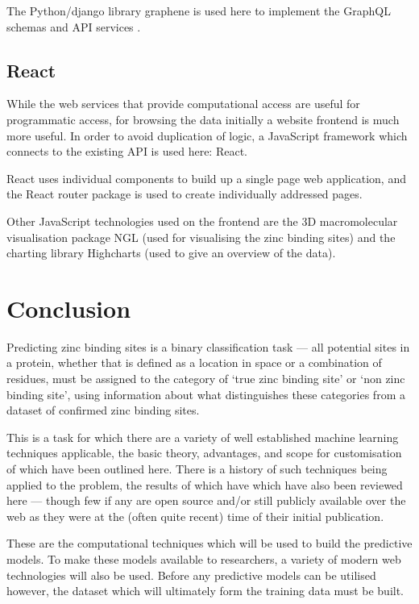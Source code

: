 The Python/django library graphene is used here to implement the GraphQL schemas and API services \cite{graphene}.

\subsection{React}

While the web services that provide computational access are useful for programmatic access, for browsing the data initially a website frontend is much more useful. In order to avoid duplication of logic, a JavaScript framework which connects to the existing API is used here: React.

React uses individual components to build up a single page web application, and the React router package is used to create individually addressed pages.

Other JavaScript technologies used on the frontend are the 3D macromolecular visualisation package NGL (used for visualising the zinc binding sites) \cite{rose2015ngl} and the charting library Highcharts (used to give an overview of the data).

\section{Conclusion}

Predicting zinc binding sites is a binary classification task --- all potential sites in a protein, whether that is defined as a location in space or a combination of residues, must be assigned to the category of `true zinc binding site' or `non zinc binding site', using information about what distinguishes these categories from a dataset of confirmed zinc binding sites.

This is a task for which there are a variety of well established machine learning techniques applicable, the basic theory, advantages, and scope for customisation of which have been outlined here. There is a history of such techniques being applied to the problem, the results of which have which have also been reviewed here --- though few if any are open source and/or still publicly available over the web as they were at the (often quite recent) time of their initial publication.

These are the computational techniques which will be used to build the predictive models. To make these models available to researchers, a variety of modern web technologies will also be used. Before any predictive models can be utilised however, the dataset which will ultimately form the training data must be built.